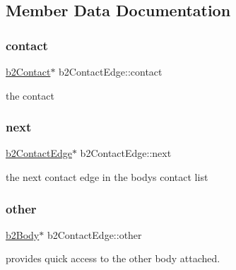 \subsection{Member Data Documentation}
\mbox{\label{structb2_contact_edge_a2fbfaffa0dfdf715fd1a709cff939dee}} 
\subsubsection{\texorpdfstring{contact}{contact}}
{\footnotesize\ttfamily \mbox{\hyperlink{classb2_contact}{b2\+Contact}}$\ast$ b2\+Contact\+Edge\+::contact}



the contact 

\mbox{\label{structb2_contact_edge_a9af32b3cfadf35a927f4dffcf6338a6d}} 
\subsubsection{\texorpdfstring{next}{next}}
{\footnotesize\ttfamily \mbox{\hyperlink{structb2_contact_edge}{b2\+Contact\+Edge}}$\ast$ b2\+Contact\+Edge\+::next}



the next contact edge in the body\textquotesingle{}s contact list 

\mbox{\label{structb2_contact_edge_a69015fc22e064eac04ed74f27a13ae78}} 
\subsubsection{\texorpdfstring{other}{other}}
{\footnotesize\ttfamily \mbox{\hyperlink{classb2_body}{b2\+Body}}$\ast$ b2\+Contact\+Edge\+::other}



provides quick access to the other body attached. 

\mbox{\label{structb2_contact_edge_a606dfacb78dc5c51672e4d7449006b8c}} 

